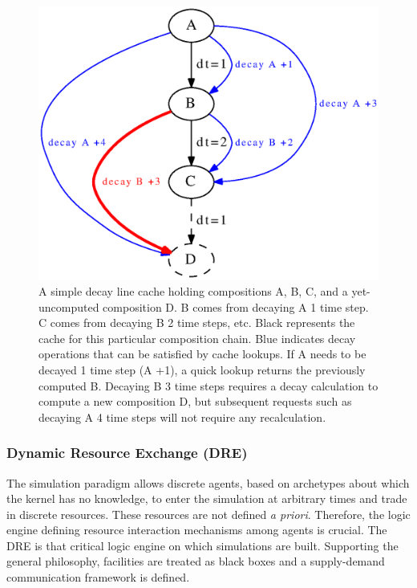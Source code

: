 \begin{figure}[htbp!]
\begin{center}
\includegraphics{./images/compositions}
\end{center}
\caption{
A simple decay line cache holding compositions A, B, C, and a
yet-uncomputed composition D.  B comes from decaying A 1 time step.  C comes
from decaying B 2 time steps, etc.  Black represents the cache for this
particular composition chain. Blue indicates decay operations that can be
satisfied by cache lookups.   If A needs to be decayed 1 time step (A +1), a
quick lookup returns the previously computed B.  Decaying B 3 time steps
requires a decay calculation to compute a new composition D, but subsequent
requests such as decaying A 4 time steps will not require any recalculation.
}
\label{fig:compositions}
\end{figure}


\subsubsection{Dynamic Resource Exchange (DRE)}

The \Cyclus simulation paradigm allows discrete agents, based on archetypes
about which the kernel has no knowledge, to enter the simulation at arbitrary
times and trade in discrete resources. These resources are not defined \textit{a
  priori}. Therefore, the logic engine defining resource interaction mechanisms
among agents is crucial. The \gls{DRE} is that critical logic engine on which
\Cyclus simulations are built.  Supporting the general \Cyclus philosophy,
facilities are treated as black boxes and a supply-demand communication
framework is defined.

